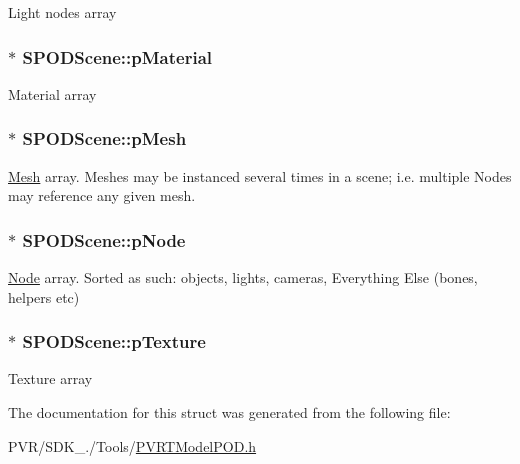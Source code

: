 Light nodes array \hypertarget{struct_s_p_o_d_scene_ae0c7229354a9dad48fa5a7860d0fb574}{
\subsubsection[{p\+Material}]{$\ast$ S\+P\+O\+D\+Scene\+::p\+Material}}\label{struct_s_p_o_d_scene_ae0c7229354a9dad48fa5a7860d0fb574}
Material array \hypertarget{struct_s_p_o_d_scene_abe073dec205d6a8509443812ead74c8f}{
\subsubsection[{p\+Mesh}]{$\ast$ S\+P\+O\+D\+Scene\+::p\+Mesh}}\label{struct_s_p_o_d_scene_abe073dec205d6a8509443812ead74c8f}
\hyperlink{class_mesh}{Mesh} array. Meshes may be instanced several times in a scene; i.\+e. multiple Nodes may reference any given mesh. \hypertarget{struct_s_p_o_d_scene_a00bcbd5609fe18b51c55b119b50e27ad}{
\subsubsection[{p\+Node}]{$\ast$ S\+P\+O\+D\+Scene\+::p\+Node}}\label{struct_s_p_o_d_scene_a00bcbd5609fe18b51c55b119b50e27ad}
\hyperlink{struct_node}{Node} array. Sorted as such\+: objects, lights, cameras, Everything Else (bones, helpers etc) \hypertarget{struct_s_p_o_d_scene_aaa264e78f9007121bb279875eaafd2ad}{
\subsubsection[{p\+Texture}]{$\ast$ S\+P\+O\+D\+Scene\+::p\+Texture}}\label{struct_s_p_o_d_scene_aaa264e78f9007121bb279875eaafd2ad}
Texture array 

The documentation for this struct was generated from the following file\+:\begin{DoxyCompactItemize}
\item 
P\+V\+R/\+S\+D\+K\+\_./\+Tools/\hyperlink{_p_v_r_t_model_p_o_d_8h}{P\+V\+R\+T\+Model\+P\+O\+D.\+h}\end{DoxyCompactItemize}
